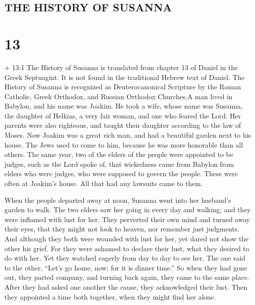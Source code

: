 \hypertarget{the-history-of-susanna}{%
\subsection{THE HISTORY OF SUSANNA}\label{the-history-of-susanna}}

\hypertarget{section-12}{%
\section{13}\label{section-12}}

 + 13:1 The History of Susanna is translated from chapter 13
of Daniel in the Greek Septuagint. It is not found in the traditional
Hebrew text of Daniel. The History of Susanna is recognized as
Deuterocanonical Scripture by the Roman Catholic, Greek Orthodox, and
Russian Orthodox Churches.A man lived in Babylon, and his name was
Joakim.  He took a wife, whose name was Susanna, the
daughter of Helkias, a very fair woman, and one who feared the Lord.
 Her parents were also righteous, and taught their daughter
according to the law of Moses.  Now Joakim was a great rich
man, and had a beautiful garden next to his house. The Jews used to come
to him, because he was more honorable than all others.  The
same year, two of the elders of the people were appointed to be judges,
such as the Lord spoke of, that wickedness came from Babylon from elders
who were judges, who were supposed to govern the people. 
These were often at Joakim's house. All that had any lawsuits came to
them.

 When the people departed away at noon, Susanna went into
her husband's garden to walk.  The two elders saw her going
in every day and walking; and they were inflamed with lust for her.
 They perverted their own mind and turned away their eyes,
that they might not look to heaven, nor remember just judgments.
 And although they both were wounded with lust for her, yet
dared not show the other his grief.  For they were ashamed
to declare their lust, what they desired to do with her. 
Yet they watched eagerly from day to day to see her.  The
one said to the other, ``Let's go home, now; for it is dinner time.''
 So when they had gone out, they parted company, and
turning back again, they came to the same place. After they had asked
one another the cause, they acknowledged their lust. Then they appointed
a time both together, when they might find her alone.

